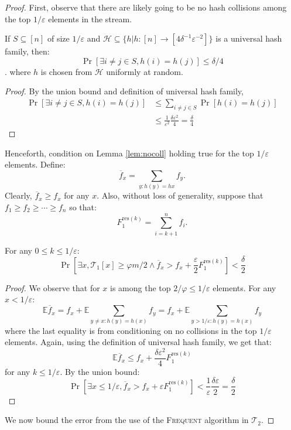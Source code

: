 \documentclass[sigconf,review=true,anonymous=true,screen]{acmart}
\newcommand{\eps}{\varepsilon}
\renewcommand{\phi}{\varphi}
\begin{document}
\begin{proof}
First, observe that there are likely going to be no hash collisions among the top $1/\eps$ elements in the stream.	
\begin{lemma}\label{lem:nocoll}
If $S \subseteq [n]$ of size $1/\varepsilon$ and $\mathcal{H} \subseteq \{h|h:[n]\to [4 \delta^{-1}\varepsilon^{-2}]\}$ is a universal hash family, then:
$$\Pr[\exists i \neq j \in S, h(i) = h(j)] \leq \delta/4$$.
 where $h$ is chosen from $\mathcal{H}$ uniformly at random.\\
\end{lemma}
\begin{proof}
By the union bound and definition of universal hash family,
\begin{align*}
\Pr[\exists i \neq j \in S, h(i) = h(j)] &\leq \sum_{i\neq j \in S} \Pr[h(i)=h(j)]\\ 
&\leq \frac{1}{\eps^2} \frac{\delta \eps^2}{4} = \frac{\delta}{4}
\end{align*}
\end{proof}
Henceforth, condition on Lemma \ref{lem:nocoll} holding true for the top $1/\eps$ elements. Define:
$$\overline{f}_x=\sum_{y:h(y)=h{x}}f_y.$$
Clearly, $\overline{f}_x \geq f_x$ for any $x$.
Also, without loss of generality, suppose that $f_1 \geq f_2 \geq \cdots \geq f_n$ so that:
$$F^{\text{res}(k)}_1=\sum_{i=k+1}^n f_{i}.$$
\begin{lemma}
For any $0 \leq k \leq 1/\eps$:
$$\Pr[\exists x, \mathcal{T}_1[x] \geq \phi m/2 \wedge \overline{f}_x > f_x +\frac{\eps}{2} F_1^{\text{res}(k)}] < \frac{\delta}{2}$$
\end{lemma}
\begin{proof}
We observe that for $x$ is among the top $2/\phi \leq 1/\eps$ elements. For any $x<1/\eps$:
\begin{equation*}
\mathbb{E} \overline{f}_x = f_x + \mathbb{E} \sum_{y \neq x: h(y)=h(x)} f_y
 = f_x + \mathbb{E} \sum_{y > 1/\eps: h(y)=h(x)} f_y
\end{equation*}
where the last equality is from conditioning on no collisions in the top $1/\eps$ elements. Again, using the definition of universal hash family, we get that:
$$\mathbb{E} \overline{f}_x \leq f_x + \frac{\delta \eps^2}{4} F_1^{\text{res}(k)}$$
for any $k \leq 1/\eps$. By the union bound:
$$\Pr[\exists x \leq 1/\eps, \overline{f}_x > f_x + \eps F_1^{\text{res}(k)}]< \frac{1}{\eps} \frac{\delta\eps}{2} = \frac{\delta}{2}$$
\end{proof}
We now bound the error from the use of the \textsc{Frequent} algorithm in $\mathcal{T}_2$.

\end{proof}
\end{document}
